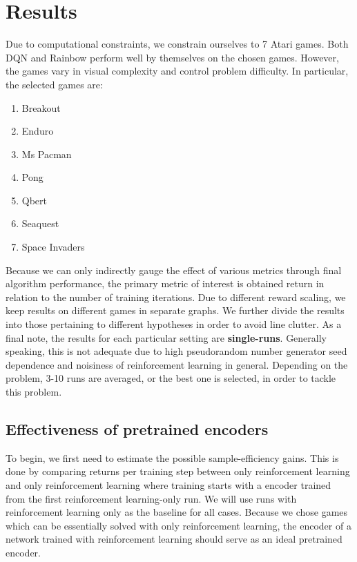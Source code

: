 \chapter{Results}
\label{ch-results}
Due to computational constraints, we constrain ourselves to 7 Atari games.
Both DQN and Rainbow perform well by themselves on the chosen games.
However, the games vary in visual complexity and control problem difficulty.
In particular, the selected games are: 
\begin{enumerate}
		\item Breakout
		\item Enduro
		\item Ms Pacman
		\item Pong
		\item Qbert
		\item Seaquest
		\item Space Invaders
\end{enumerate}

Because we can only indirectly gauge the effect of various metrics through 
final algorithm performance, the primary metric of interest is obtained 
return in relation to the number of training iterations.
Due to different reward scaling, we keep results on different games in separate graphs.
We further divide the results into those pertaining to different hypotheses
in order to avoid line clutter.
As a final note, the results for each particular setting are \textbf{single-runs}.
Generally speaking, this is not adequate due to high pseudorandom number generator seed 
dependence and noisiness of reinforcement learning in general. 
Depending on the problem, 3-10 runs are averaged, or the best one is selected,
in order to tackle this problem.

\section{Effectiveness of pretrained encoders}
\label{sec-effectiveness-of-pretrained}
To begin, we first need to estimate the possible sample-efficiency gains.
This is done by comparing returns per training step between only reinforcement learning
and only reinforcement learning where training starts with a encoder
trained from the first reinforcement learning-only run.
We will use runs with reinforcement learning only as the baseline for all cases.
Because we chose games which can be essentially solved with only reinforcement learning,
the encoder of a network trained with reinforcement learning should serve
as an ideal pretrained encoder.

